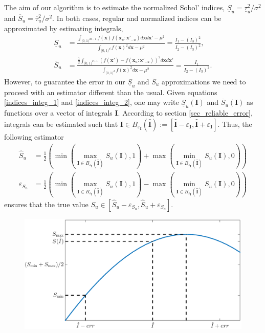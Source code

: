 \documentclass[]{elsarticle}
\theoremstyle{definition}
\newcommand{\bvec}[1]{\boldsymbol{#1}}
\newcommand{\vx}{\bvec{x}}
\newcommand{\vI}{\bvec{I}}
\begin{document}
The aim of our algorithm is to estimate the normalized Sobol' indices, $\underline{S}_u = \underline{\tau}_u^2/\sigma^2$ and $\overline{S}_u = \overline{\tau}_u^2/\sigma^2$. In both cases, regular and normalized indices can be approximated by estimating integrals,
\begin{align}\label{indices_integ_1}
\underline{S}_u & = \frac{\int_{[0,1)^{2d-1}} f(\vx)f(\vx_{u}:{\vx'}_{-u})d\vx d{\vx'} - \mu^2 }{\int_{[0,1)^{d}} f(\vx)^2 d{\vx}-\mu^2} = \frac{I_1-(I_3)^2}{I_2-(I_3)^2}, \\
\label{indices_integ_2}
\overline{S}_u & = \frac{\frac{1}{2}\int_{[0,1)^{d+1}}(f(\vx')-f(\vx_u:{\vx'}_{-u}))^2d\vx d{\vx'}}{\int_{[0,1)^{d}} f(\vx)^2 d{\vx}-\mu^2} = \frac{I_1}{I_2-(I_3)^2}.
\end{align}
However, to guarantee the error in our $\underline{S}_u$ and $\overline{S}_u$ approximations we need to proceed with an estimator different than the usual. Given equations \eqref{indices_integ_1} and \eqref{indices_integ_2}, one may write $\underline{S}_u(\vI)$ and $\overline{S}_u(\vI)$ as functions over a vector of integrals $\vI$. According to section \ref{sec_reliable_error}, integrals can be estimated such that $\vI\in B_{\varepsilon_{\vI}}(\widehat{\vI}):=[\widehat{\vI}-\varepsilon_{\vI},\widehat{\vI}+\varepsilon_{\vI} ]$. Thus, the following estimator
\begin{align*}
\widehat{S}_u & = \frac{1}{2}\left(\min\left(\max_{\vI\in B_{\varepsilon_{\vI}}(\widehat{\vI})} S_u(\vI),1\right) + \max\left(\min_{\vI\in B_{\varepsilon_{\vI}}(\widehat{\vI})} S_u(\vI),0\right) \right) \\
\varepsilon_{S_u} & = \frac{1}{2}\left(\min\left(\max_{\vI\in B_{\varepsilon_{\vI}}(\widehat{\vI})} S_u(\vI),1\right) - \max\left(\min_{\vI\in B_{\varepsilon_{\vI}}(\widehat{\vI})} S_u(\vI),0\right) \right)
\end{align*}
ensures that the true value $S_u\in [\widehat{S}_u - \varepsilon_{S_u}, \widehat{S}_u + \varepsilon_{S_u}]$.

\begin{figure}\centering
\includegraphics[width=1.\textwidth]{Images/scheme_S.eps}
\end{figure}
\end{document}
